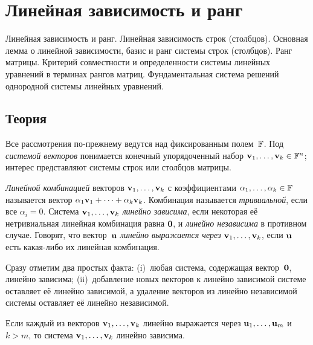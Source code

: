 
\section{Линейная зависимость и ранг}
\label{sec:1.1.02-rank}

\begin{ticket}
Линейная зависимость и ранг. Линейная зависимость строк (столбцов). Основная лемма о линейной зависимости, базис и ранг системы строк (столбцов). Ранг матрицы. Критерий совместности и определенности системы линейных уравнений в терминах рангов матриц. Фундаментальная система решений однородной системы линейных уравнений.
\end{ticket}

\subsection*{Теория}

Все рассмотрения по-прежнему ведутся над фиксированным полем~$\mathbb{F}$. Под
\emph{системой векторов} понимается конечный упорядоченный набор
$\mathbf{v}_1, \dots, \mathbf{v}_k \in \mathbb{F}^n$; интерес представляют системы
строк или столбцов матрицы.

\begin{definition}
\label{def:lin-dep}
\emph{Линейной комбинацией} векторов $\mathbf{v}_1, \dots, \mathbf{v}_k$ с
коэффициентами $\alpha_1, \dots, \alpha_k \in \mathbb{F}$ называется вектор
$\alpha_1 \mathbf{v}_1 + \dots + \alpha_k \mathbf{v}_k$. Комбинация
называется \emph{тривиальной}, если все $\alpha_i = 0$. Система
$\mathbf{v}_1, \dots, \mathbf{v}_k$ \emph{линейно зависима}, если некоторая
её нетривиальная линейная комбинация равна $\mathbf{0}$, и \emph{линейно
независима} в противном случае. Говорят, что вектор~$\mathbf{u}$
\emph{линейно выражается через} $\mathbf{v}_1, \dots, \mathbf{v}_k$, если
$\mathbf{u}$ есть какая-либо их линейная комбинация.
\end{definition}

\begin{remark}
\label{rem:basic-dep-facts}
Сразу отметим два простых факта: (i)~любая система, содержащая
вектор~$\mathbf{0}$, линейно зависима; (ii)~добавление новых векторов к
линейно зависимой системе оставляет её линейно зависимой, а удаление
векторов из линейно независимой системы оставляет её линейно
независимой.
\end{remark}

\begin{theorem}
\label{thm:main-lemma}
Если каждый из векторов $\mathbf{v}_1, \dots, \mathbf{v}_k$ линейно
выражается через $\mathbf{u}_1, \dots, \mathbf{u}_m$ и $k > m$, то система
$\mathbf{v}_1, \dots, \mathbf{v}_k$ линейно зависима.
\end{theorem}

